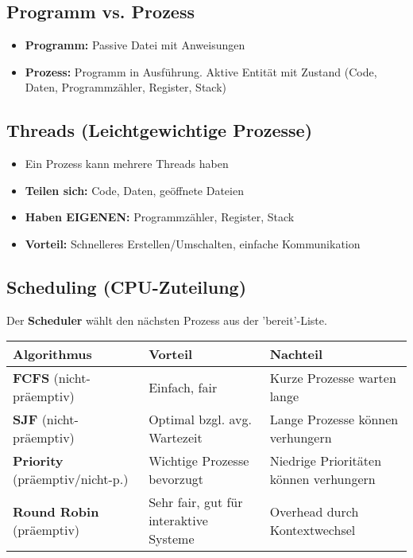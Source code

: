 \documentclass[9pt,a4paper]{extarticle}
\begin{document}
\begin{multicols*}{2}
\subsection{Programm vs. Prozess}
\begin{itemize}
\item \textbf{Programm:} Passive Datei mit Anweisungen
\item \textbf{Prozess:} Programm in Ausführung. Aktive Entität mit Zustand (Code, Daten, Programmzähler, Register, Stack)
\end{itemize}

\subsection{Threads (Leichtgewichtige Prozesse)}
\begin{itemize}
\item Ein Prozess kann mehrere Threads haben
\item \textbf{Teilen sich:} Code, Daten, geöffnete Dateien
\item \textbf{Haben EIGENEN:} Programmzähler, Register, Stack
\item \textbf{Vorteil:} Schnelleres Erstellen/Umschalten, einfache Kommunikation
\end{itemize}

\subsection{Scheduling (CPU-Zuteilung)}
Der \textbf{Scheduler} wählt den nächsten Prozess aus der 'bereit'-Liste.

\begin{center}
\begin{tabular}{|p{2.8cm}|p{2.5cm}|p{2.5cm}|}
\hline
\textbf{Algorithmus} & \textbf{Vorteil} & \textbf{Nachteil} \\
\hline
\textbf{FCFS} (nicht-präemptiv) & Einfach, fair & Kurze Prozesse warten lange \\
\hline
\textbf{SJF} (nicht-präemptiv) & Optimal bzgl. avg. Wartezeit & Lange Prozesse können verhungern \\
\hline
\textbf{Priority} (präemptiv/nicht-p.) & Wichtige Prozesse bevorzugt & Niedrige Prioritäten können verhungern \\
\hline
\textbf{Round Robin} (präemptiv) & Sehr fair, gut für interaktive Systeme & Overhead durch Kontextwechsel \\
\hline
\end{tabular}
\end{center}


\end{multicols*}
\end{document}
